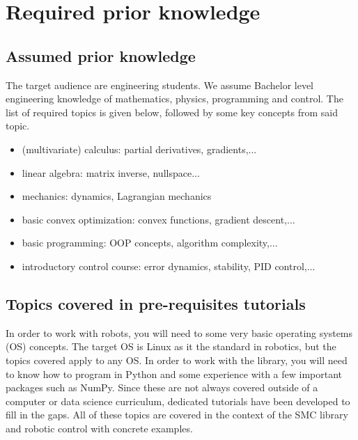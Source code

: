 \chapter{Required prior knowledge}

\section{Assumed prior knowledge}
The target audience are engineering students.
We assume Bachelor level engineering knowledge of mathematics,
physics, programming and control.
The list of required topics is given below,
followed by some key concepts from said topic.

\begin{itemize}
		\item (multivariate) calculus: partial derivatives, gradients,...
		\item linear algebra: matrix inverse, nullspace...
		\item mechanics: dynamics, Lagrangian mechanics
		\item basic convex optimization: convex functions, 
				gradient descent,...
		\item basic programming: OOP concepts, algorithm complexity,...
		\item introductory control course: error dynamics,  
				stability, PID control,...
\end{itemize}


\section{Topics covered in pre-requisites tutorials}
In order to work with robots, you will need to some
very basic operating systems (OS) concepts.
The target OS is Linux as it the standard in robotics,
but the topics covered apply to any OS.
In order to work with the library, you will need to know
how to program in Python and some experience
with a few important packages such as NumPy.
Since these are not always covered outside of a
computer or data science curriculum,
dedicated tutorials have been developed to fill in the gaps.
All of these topics are covered in the context of
the SMC library and robotic control with concrete examples.

